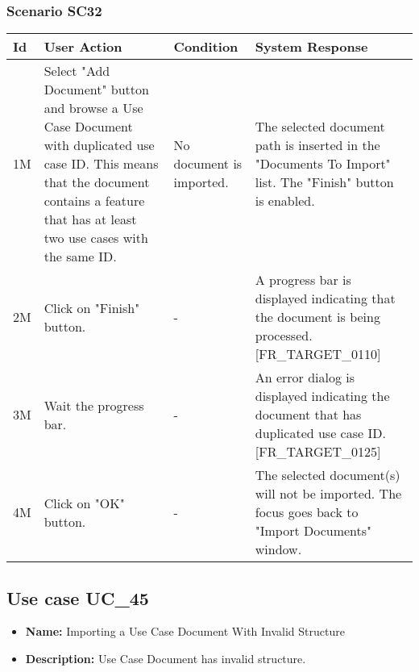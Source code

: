 \documentclass[a4paper,11pt]{article}
\newcommand{\bl}{\\ \hline}
\begin{document}
\subsubsection*{Scenario SC32}
\begin{tabular}{|p{0.4in}|p{1.5in}|p{1.5in}|p{1.5in}|}
\hline
Id & User Action & Condition & System Response \bl 
1M & Select "Add Document" button and browse a Use Case Document
						with duplicated use case ID. This means that the document contains
						a feature that has at least two use cases with the same ID.
					 & No document is imported. & The selected document path is inserted in the "Documents
						To Import" list. The "Finish" button is enabled.\bl
2M & Click on "Finish" button. & - & A progress bar is displayed indicating that the document
						is being processed. [FR_TARGET_0110]\bl
3M & Wait the progress bar.  & - & An error dialog is displayed indicating the document that
						has duplicated use case ID. [FR_TARGET_0125] \bl
4M & Click on "OK" button. & - & The selected document(s) will not be imported. The focus
						goes back to "Import Documents" window.\bl
\end{tabular}
\subsection*{Use case UC_45}
\begin{itemize}
\item {\bf Name: }Importing a Use Case Document With Invalid Structure
\item {\bf Description: }Use Case Document has invalid structure.
\end{itemize}
\end{document}
